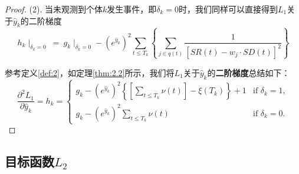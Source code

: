 \begin{proof}
(2). 当未观测到个体$k$发生事件，即$\delta_k=0$时，我们同样可以直接得到$L_1$关于$\hat{y}_k$的二阶梯度$$
h_k\mid_{\delta_k=0}\ =\ g_k\mid_{\delta_k=0} - (e^{\hat{y}_k})^2 \sum_{t\le T_k}\left\{\sum_{j\in q(t)} \frac{1}{[SR(t) - w_j\cdot SD(t)]^2}\right\}
$$

参考定义\ref{def:2}，如定理\ref{thm:2.2}所示，我们将$L_1$关于$\hat{y}_k$的\textbf{二阶梯度}总结如下：$$
\frac{\partial^2 L_1}{\partial \hat{y}_k} = h_k = 
\begin{cases}
g_k - (e^{\hat{y}_k})^2 \left\{ \left[\sum_{t\le T_k} \nu(t)\right] - \xi(T_k) \right\} + 1 & \text{if } \delta_k = 1,\\
g_k - (e^{\hat{y}_k})^2 \sum_{t\le T_k} \nu(t) & \text{if } \delta_k = 0.
\end{cases}
$$
\end{proof}

\subsection{目标函数$L_2$}

